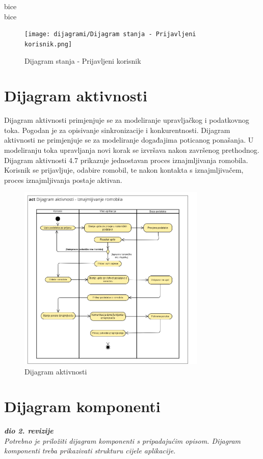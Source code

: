 			\indent bice \\
			
			\indent bice \\
		
			\begin{figure}[H]
				\centering
				\texttt{[image: dijagrami/Dijagram stanja - Prijavljeni korisnik.png]}
				\caption{Dijagram stanja - Prijavljeni korisnik}
				\label{fig:your_label}
			\end{figure}
			
			
			\eject 
		
		\section{Dijagram aktivnosti}
			
			\indent Dijagram aktivnosti primjenjuje se za modeliranje upravljačkog i podatkovnog toka. Pogodan je za opisivanje sinkronizacije i konkurentnosti. Dijagram aktivnosti ne primjenjuje se za modeliranje događajima poticanog ponašanja. U modeliranju toka upravljanja novi korak se izvršava nakon završenog prethodnog. \\
			
			\indent Dijagram aktivnosti 4.7 prikazuje jednostavan proces iznajmljivanja romobila. 
			Korisnik se prijavljuje, odabire romobil, te nakon kontakta s iznajmljivačem, proces iznajmljivanja postaje aktivan. \\
			
			\begin{figure}[H]
				\centering
				\includegraphics[width=0.8\textwidth]{dijagrami/aktivnost.png}
				\caption{Dijagram aktivnosti}
				\label{fig:your_label}
			\end{figure}
			
			\eject
			
		\section{Dijagram komponenti}
		
			\textbf{\textit{dio 2. revizije}}\\
		
			 \textit{Potrebno je priložiti dijagram komponenti s pripadajućim opisom. Dijagram komponenti treba prikazivati strukturu cijele aplikacije.}